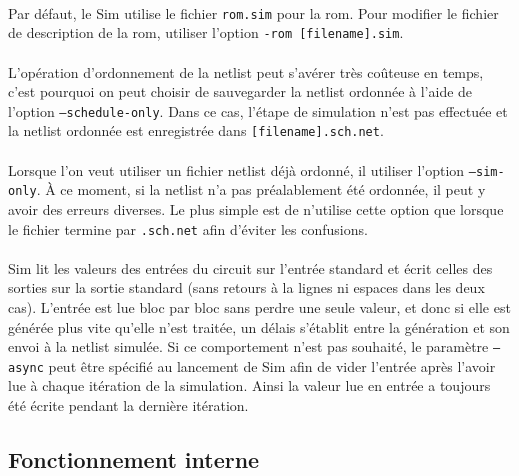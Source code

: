 \documentclass{article}
\begin{document}
\paragraph{}Par défaut, le Sim utilise le fichier \texttt{rom.sim} pour la rom. Pour modifier le fichier de description de la rom, utiliser l'option \texttt{-rom [filename].sim}.

\paragraph{}L'opération d'ordonnement de la netlist peut s'avérer très coûteuse en temps, c'est pourquoi on peut choisir de sauvegarder la netlist ordonnée à l'aide de l'option \texttt{--schedule-only}. Dans ce cas, l'étape de simulation n'est pas effectuée et la netlist ordonnée est enregistrée dans \texttt{[filename].sch.net}.

\paragraph{}Lorsque l'on veut utiliser un fichier netlist déjà ordonné, il utiliser l'option \texttt{--sim-only}. À ce moment, si la netlist n'a pas préalablement été ordonnée, il peut y avoir des erreurs diverses. Le plus simple est de n'utilise cette option que lorsque le fichier termine par \texttt{.sch.net} afin d'éviter les confusions.

\paragraph{}Sim lit les valeurs des entrées du circuit sur l'entrée standard et écrit celles des sorties sur la sortie standard (sans retours à la lignes ni espaces dans les deux cas). L'entrée est lue bloc par bloc sans perdre une seule valeur, et donc si elle est générée plus vite qu'elle n'est traitée, un délais s'établit entre la génération et son envoi à la netlist simulée. Si ce comportement n'est pas souhaité, le paramètre \texttt{--async} peut être spécifié au lancement de Sim afin de vider l'entrée après l'avoir lue à chaque itération de la simulation. Ainsi la valeur lue en entrée a toujours été écrite pendant la dernière itération.

\subsection{Fonctionnement interne}
\end{document}
